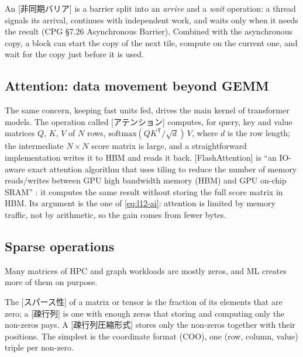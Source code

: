 \documentclass[../main.tex]{subfiles}
\begin{document}
\begin{definition}
  An [非同期バリア] is a barrier split into
  an \emph{arrive} and a \emph{wait} operation: a thread signals its
  arrival, continues with independent work, and waits only when it
  needs the result (CPG §7.26 Asynchronous Barrier).  Combined with the
  asynchronous copy, a block can start the copy of the next tile, compute
  on the current one, and wait for the copy just before it is
  used.
\end{definition}

\subsection{Attention: data movement beyond GEMM}

The same concern, keeping fast units fed, drives the main kernel of
transformer models.  The operation called
[アテンション] computes, for
query, key and value matrices $Q$, $K$, $V$ of $N$ rows,
$\mathrm{softmax}(QK^{\mathsf T}/\sqrt{d})\,V$, where $d$ is the row
length; the intermediate $N \times N$ score matrix is large, and a
straightforward implementation writes it to HBM and reads it back.
[FlashAttention] is \enquote{an IO-aware exact
attention algorithm that uses tiling to reduce the number of memory
reads/writes between GPU high bandwidth memory (HBM) and GPU on-chip
SRAM} \cite{dao2022flashattention}: it computes the same result without
storing the full score matrix in HBM.  Its argument is the one of
\cref{eq:l12-ai}: attention is limited by memory traffic, not by
arithmetic, so the gain comes from fewer bytes.

\subsection{Sparse operations}

Many matrices of HPC and graph workloads are mostly zeros, and ML
creates more of them on purpose.

\begin{definition}
  The [スパース性] of a matrix or tensor is the fraction
  of its elements that are zero; a [疎行列] is one with enough
  zeros that storing and computing only the non-zeros pays.  A
  [疎行列圧縮形式] stores only the
  non-zeros together with their positions.  The simplest is the
  coordinate format (COO), one (row, column, value) triple per
  non-zero.
\end{definition}
\end{document}
